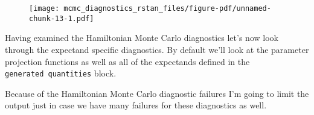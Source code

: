 \documentclass[
  letterpaper,
  DIV=11,
  numbers=noendperiod]{scrartcl}
\newenvironment{Shaded}{\begin{snugshade}}{\end{snugshade}}
\newcommand{\FunctionTok}[1]{\textcolor[rgb]{0.28,0.35,0.67}{#1}}
\newcommand{\NormalTok}[1]{\textcolor[rgb]{0.00,0.23,0.31}{#1}}
\newcommand{\SpecialCharTok}[1]{\textcolor[rgb]{0.37,0.37,0.37}{#1}}
\begin{document}
\begin{figure}[H]

{\centering \texttt{[image: mcmc\_diagnostics\_rstan\_files/figure-pdf/unnamed-chunk-13-1.pdf]}

}

\end{figure}

Having examined the Hamiltonian Monte Carlo diagnostics let's now look
through the expectand specific diagnostics. By default we'll look at the
parameter projection functions as well as all of the expectands defined
in the \texttt{generated\ quantities} block.

Because of the Hamiltonian Monte Carlo diagnostic failures I'm going to
limit the output just in case we have many failures for these
diagnostics as well.

\begin{Shaded}
\end{Shaded}
\end{document}
